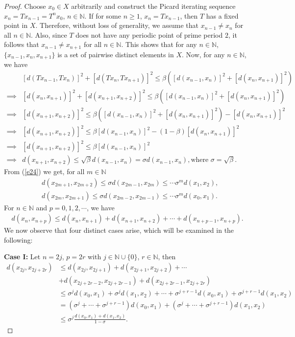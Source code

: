 \documentclass[11pt,reqno,a4paper]{amsart}
\theoremstyle{plain}
\theoremstyle{definition}
\theoremstyle{remark}
\numberwithin{equation}{section}
\begin{document}
\begin{proof}
Choose $x_0\in X$ arbitrarily and construct the Picard iterating sequence $x_n=Tx_{n-1}=T^n x_0$, $n\in \mathbb{N}$. If for some $n\ge 1$, $x_n=Tx_{n-1}$, then $T$ has a fixed point in $X$. Therefore, without loss of generality, we assume that $x_{n-1} \neq x_n$ for all $n \in \mathbb{N}$. Also, since $T$ does not have any periodic point of prime period $2$, it follows that $x_{n-1} \neq x_{n+1}$ for all $n \in \mathbb{N}$. This shows that for any $n \in \mathbb{N}$, $\{x_{n-1}, x_n, x_{n+1}\}$ is a set of pairwise distinct elements in $X$. Now, for any $n \in \mathbb{N}$, we have
\begin{align}\label{e24}
&[d(Tx_{n-1},Tx_{n})]^2 + [d(Tx_{n},Tx_{n+1})]^2 
\le \beta ([d(x_{n-1},x_{n})]^2+[d(x_{n},x_{n+1})]^2)\nonumber\\
\implies &[d(x_{n},x_{n+1})]^2+[d(x_{n+1},x_{n+2})]^2 
\le \beta ([d(x_{n-1},x_{n})]^2+[d(x_{n},x_{n+1})]^2)\nonumber\\
\implies &[d(x_{n+1},x_{n+2})]^2 
\le \beta ([d(x_{n-1},x_{n})]^2+[d(x_{n},x_{n+1})]^2)-[d(x_{n},x_{n+1})]^2\nonumber\\
\implies &[d(x_{n+1},x_{n+2})]^2 
\le \beta [d(x_{n-1},x_{n})]^2-(1-\beta)[d(x_{n},x_{n+1})]^2\nonumber\\
\implies &[d(x_{n+1},x_{n+2})]^2 \le \beta [d(x_{n-1},x_{n})]^2\nonumber\\
\implies &d(x_{n+1},x_{n+2}) \le \sqrt{\beta} d(x_{n-1},x_{n})=\sigma d(x_{n-1},x_{n}),\text{where }\sigma=\sqrt{\beta}.
\end{align}
From (\ref{e24}) we get, for all $m \in \mathbb{N}$ 
\begin{align*}
&d(x_{2m+1},x_{2m+2}) \le \sigma d(x_{2m-1},x_{2m}) \le \cdots \sigma^m d(x_1,x_2),\\
&d(x_{2m},x_{2m+1}) \le \sigma d(x_{2m-2},x_{2m-1}) \le \cdots \sigma^m d(x_0,x_1).
\end{align*}
For $n \in \mathbb{N}$ and $p=0,1,2,\cdots$, we have 
\begin{align}\label{e25}
d(x_n,x_{n+p})\le d(x_n,x_{n+1})+d(x_{n+1},x_{n+2})+\cdots+d(x_{n+p-1},x_{n+p}).
\end{align}
We now observe that four distinct cases arise, which will be examined in the following:

\smallskip
\textbf{Case I:} Let $n=2j$, $p=2r$ with $j \in \mathbb{N} \cup \{0\}$, $r \in \mathbb{N}$, then
\begin{align}\label{e26}
d(x_{2j},x_{2j+2r})
&\le d(x_{2j},x_{2j+1})+d(x_{2j+1},x_{2j+2})+\cdots\nonumber\\
&+d(x_{2j+2r-2},x_{2j+2r-1})+d(x_{2j+2r-1},x_{2j+2r})\nonumber\\
&\le \sigma^j d(x_0,x_1)+\sigma^j d(x_1,x_2)+\cdots+\sigma^{j+r-1} d(x_0,x_1)+\sigma^{j+r-1} d(x_1,x_2)\nonumber\\
&=(\sigma^j+\cdots+\sigma^{j+r-1})d(x_0,x_1)+(\sigma^j+\cdots+\sigma^{j+r-1}) d(x_1,x_2)\nonumber\\
&\le \sigma^j \frac{d(x_0,x_1)+d(x_1,x_2)}{1-\sigma}.
\end{align}


\end{proof}
\end{document}
